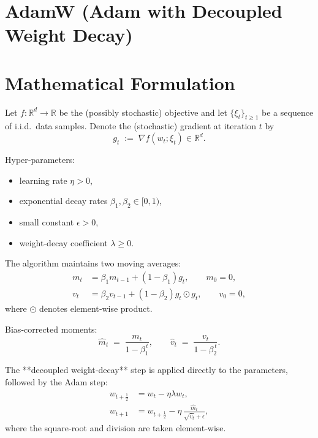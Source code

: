 \documentclass{article}
\newcommand{\RR}{\mathbb{R}}
\begin{document}
\section*{AdamW (Adam with Decoupled Weight Decay)}

\section*{Mathematical Formulation}
Let $f:\RR^{d}\!\to\!\RR$ be the (possibly stochastic) objective and let
$\{\xi_t\}_{t\ge 1}$ be a sequence of i.i.d.\ data samples.
Denote the (stochastic) gradient at iteration $t$ by
\[
g_t \;:=\; \nabla f(w_t;\xi_t)\in\RR^{d}.
\]

Hyper‑parameters:
\begin{itemize}[noitemsep]
    \item learning rate $\eta>0$,
    \item exponential decay rates $\beta_1,\beta_2\in[0,1)$,
    \item small constant $\epsilon>0$,
    \item weight‑decay coefficient $\lambda\ge 0$.
\end{itemize}

The algorithm maintains two moving averages:
\[
\begin{aligned}
m_t &= \beta_1 m_{t-1} + (1-\beta_1) g_t, \qquad m_0 = 0,\\[4pt]
v_t &= \beta_2 v_{t-1} + (1-\beta_2) g_t\odot g_t,\qquad v_0 = 0,
\end{aligned}
\]
where $\odot$ denotes element‑wise product.

Bias‑corrected moments:
\[
\hat m_t \;=\; \frac{m_t}{1-\beta_1^{\,t}},\qquad
\hat v_t \;=\; \frac{v_t}{1-\beta_2^{\,t}}.
\]

The **decoupled weight‑decay** step is applied directly to the parameters,
followed by the Adam step:
\[
\boxed{
\begin{aligned}
w_{t+\frac12}&=w_t-\eta\lambda w_t,\\[2pt]
w_{t+1}&= w_{t+\frac12}
          -\eta\,\frac{\hat m_t}{\sqrt{\hat v_t}+\epsilon},
\end{aligned}}
\]
where the square‑root and division are taken element‑wise.
\end{document}
